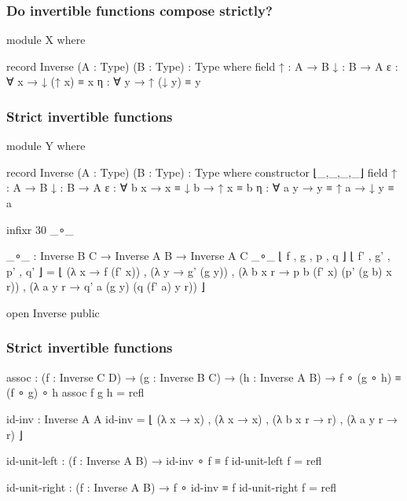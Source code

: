 \documentclass[aspectratio=169,presentation]{beamer}
\begin{document}
\begin{frame}
  \frametitle{Do invertible functions compose strictly?}
  \begin{code}[hide]
    module X where
  \end{code}
  \begin{code}
      record Inverse (A : Type) (B : Type) : Type where
        field
          ↑ : A → B
          ↓ : B → A
          ε : ∀ x  → ↓ (↑ x) ≡ x
          η : ∀ y  → ↑ (↓ y) ≡ y
  \end{code}
\end{frame}

\begin{frame}
  \frametitle{Strict invertible functions}
  \begin{code}[hide]
    module Y where
  \end{code}
  \begin{code}
      record Inverse (A : Type) (B : Type) : Type where
        constructor ⌊_,_,_,_⌋
        field
          ↑ : A → B
          ↓ : B → A
          ε : ∀ b x  → x ≡ ↓ b  → ↑ x ≡ b
          η : ∀ a y  → y ≡ ↑ a  → ↓ y ≡ a
  \end{code}
  \begin{code}[hide]
      infixr 30 _∘_
  \end{code}
  \begin{code}
      _∘_ : Inverse B C → Inverse A B → Inverse A C
      _∘_ ⌊ f , g , p , q ⌋ ⌊ f' , g' , p' , q' ⌋ =
        ⌊  (λ x → f (f' x)) ,
           (λ y → g' (g y)) ,
           (λ b x r → p b (f' x) (p' (g b) x r)) ,
           (λ a y r → q' a (g y) (q (f' a) y r)) ⌋

  \end{code}
  \begin{code}[hide]
      open Inverse public
  \end{code}
\end{frame}

\begin{frame}
  \frametitle{Strict invertible functions}
  \begin{code}
      assoc :  (f : Inverse C D)
            →  (g : Inverse B C)
            →  (h : Inverse A B)
            →  f ∘ (g ∘ h) ≡ (f ∘ g) ∘ h
      assoc f g h = refl

      id-inv : Inverse A A
      id-inv = ⌊  (λ x → x) , (λ x → x) ,
                  (λ b x r → r) , (λ a y r → r) ⌋

      id-unit-left :  (f : Inverse A B)
                   →  id-inv ∘ f ≡ f
      id-unit-left f = refl

      id-unit-right :  (f : Inverse A B)
                    →  f ∘ id-inv ≡ f
      id-unit-right f = refl
  \end{code}
\end{frame}
\end{document}
